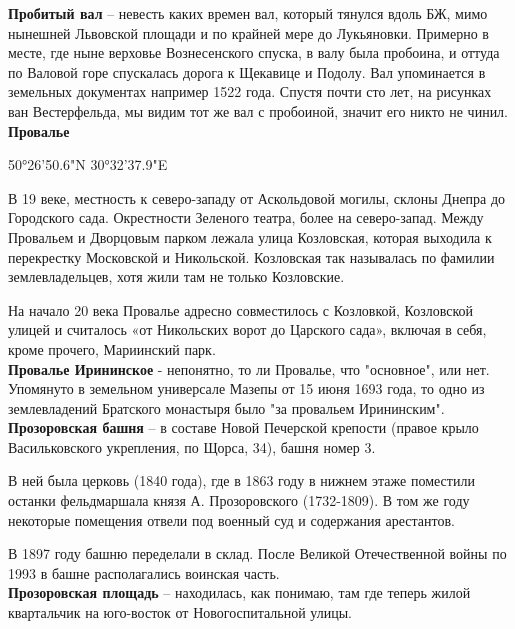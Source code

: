 \textbf{Пробитый вал} – невесть каких времен вал, который тянулся вдоль БЖ, мимо нынешней Львовской площади и по крайней мере до Лукьяновки. Примерно в месте, где ныне верховье Вознесенского спуска, в валу была пробоина, и оттуда по Валовой горе спускалась дорога к Щекавице и Подолу. Вал упоминается в земельных документах например 1522 года. Спустя почти сто лет, на рисунках ван Вестерфельда, мы видим тот же вал с пробоиной, значит его никто не чинил.\\ 

\textbf{Провалье} 

50°26'50.6"N 30°32'37.9"E

В 19 веке, местность к северо-зап\-аду от Аскольдовой могилы, склоны Днепра до Городского сада. Окрестности Зеленого театра, более на северо-запад. Между Провальем и Дворцовым парком лежала улица Козловская, которая выходила к перекрестку Московской и Никольской. Козловская так называлась по фамилии землевладельцев, хотя жили там не только Козловские.

На начало 20 века Провалье адресно совместилось с Козловкой, Козловской улицей и считалось «от Никольских ворот до Царского сада», включая в себя, кроме прочего, Мариинский парк.\\

\textbf{Провалье Ирининское} - непонятно, то ли Провалье, что "основное", или нет. Упомянуто в земельном универсале Мазепы от 15 июня 1693 года, то одно из землевладений Братского монастыря было "за провальем Ирининским".\\


\textbf{Прозоровская башня} – в составе Новой Печерской крепости (правое крыло Васильковского укрепления, по Щорса, 34), башня номер 3.

В ней была церковь (1840 года), где в 1863 году в нижнем этаже поместили останки фельдмаршала князя А. Прозоровского (1732-1809). В том же году некоторые помещения отвели под военный суд и содержания арестантов.

В 1897 году башню переделали в склад. После Великой Отечественной войны по 1993 в башне располагались воинская часть.\\


\textbf{Прозоровская площадь} – находилась, как понимаю, там где теперь жилой квартальчик на юго-восток от Новогоспитальной улицы.\\


